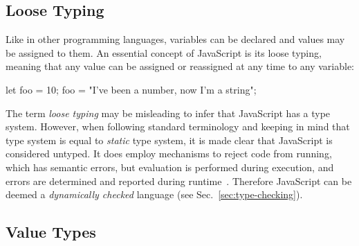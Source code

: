 \subsection{Loose Typing}
\label{sec:untyped-loosely-typed}

Like in other programming languages, variables can be declared and values may be assigned to them. An essential concept of JavaScript is its loose typing, meaning that any value can be assigned or reassigned at any time to any variable:
\begin{JsCode}[numbers=none]
let foo = 10;
foo = "I've been a number, now I'm a string";
\end{JsCode}
The term \emph{loose typing} may be misleading to infer that JavaScript has a type system. However, when following standard terminology and keeping in mind that type system is equal to \emph{static} type system, it is made clear that JavaScript is considered untyped. It does employ mechanisms to reject code from running, which has semantic errors, but evaluation is performed during execution, and errors are determined and reported during runtime~\cite[p.~291]{ES6Spec:Ecma:2015}. Therefore JavaScript can be deemed a \emph{dynamically checked} language (see Sec.~\ref{sec:type-checking}).

\subsection{Value Types}
\label{sec:value-types}

